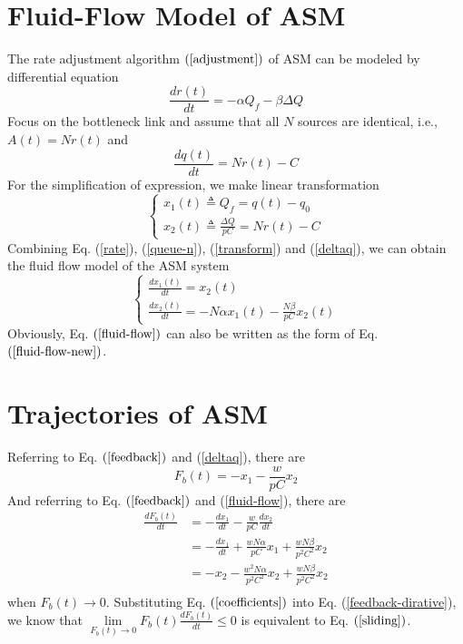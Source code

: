 \documentclass{sig-alternate-10pt}
\begin{document}
\section{Fluid-Flow Model of ASM}
The rate adjustment algorithm $(\ref{adjustment})$ of ASM can be modeled by differential equation
\begin{equation}
\frac{dr(t)}{dt}=-\alpha Q_f-\beta \Delta Q
\label{rate}
\end{equation}
Focus on the bottleneck link and assume that all $N$ sources are identical, i.e., $A(t)=Nr(t)$ and
\begin{equation}
\frac{dq(t)}{dt}=Nr(t)-C
\label{queue-n}
\end{equation}
For the simplification of expression, we make linear transformation
\begin{equation}
\left \{
\begin{array}{l}
x_1(t)\triangleq Q_f=q(t)-q_0 \\
x_2(t)\triangleq \frac{\Delta Q}{pC}=Nr(t)-C
\end{array}
\right.
\label{transform}
\end{equation}
Combining Eq. (\ref{rate}), (\ref{queue-n}), (\ref{transform}) and (\ref{deltaq}), we can obtain the fluid flow model of the ASM system 
\begin{equation}
\left \{
\begin{array}{l}
\frac{dx_1(t)}{dt}=x_2(t)\\
\frac{dx_2(t)}{dt}=-N\alpha x_1(t)-\frac{N\beta}{pC} x_2(t)
\end{array}
\right.
\label{fluid-flow}
\end{equation}
Obviously, Eq. $(\ref{fluid-flow})$ can also be written as the form of Eq. $(\ref{fluid-flow-new})$.

\section{Trajectories of ASM}
Referring to Eq. $(\ref{feedback})$ and (\ref{deltaq}), there are 
\begin{equation}
F_b(t)=-x_1-\frac{w}{pC}x_2
\end{equation}
And referring to Eq. $(\ref{feedback})$ and (\ref{fluid-flow}), there are
\begin{equation}
\begin{array}{ll}
\frac{dF_b(t)}{dt} & =-\frac{dx_1}{dt}-\frac{w}{pC}\frac{dx_2}{dt} \\
                   & =-\frac{dx_1}{dt}+\frac{wN\alpha}{pC}x_1+\frac{wN\beta}{p^2C^2}x_2 \\
                   & =-x_2-\frac{w^2N\alpha}{p^2C^2}x_2+\frac{wN\beta}{p^2C^2}x_2 \\
\end{array}
\label{feedback-dirative}
\end{equation}
when $F_b(t)\rightarrow0$. Substituting Eq. $(\ref{coefficients})$ into Eq. (\ref{feedback-dirative}), we know that $\lim\limits_{F_b(t)\rightarrow 0}^{}F_b(t)\frac{dF_b(t)}{dt}\leq 0$ is equivalent to Eq. $(\ref{sliding})$.
\end{document}
